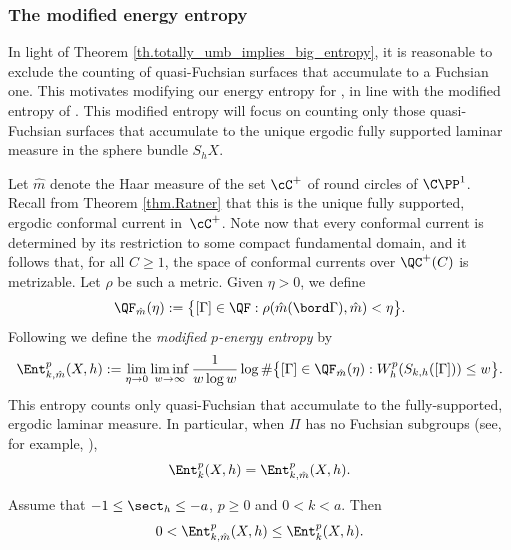 \subsubsection{The modified energy entropy}\label{sss.Modified_entropy}
In light of Theorem \ref{th.totally_umb_implies_big_entropy}, it is reasonable to exclude the counting of quasi-Fuchsian surfaces that accumulate to a Fuchsian one. This motivates modifying our energy entropy for \ksurfaces, in line with the modified entropy of \cite{MN_currents}. This modified entropy will focus on counting only those quasi-Fuchsian surfaces that accumulate to the unique ergodic fully supported laminar measure in the sphere bundle $S_hX$.

Let $\hat m$ denote the Haar measure of the set $\cC^+$ of round circles of $\C\PP^1$. Recall from Theorem \ref{thm.Ratner} that this is the unique fully supported, ergodic conformal current in~$\cC^+$. Note now that every conformal current is determined by its restriction to some compact fundamental domain, and it follows that, for all $C\geq 1$, the space of conformal currents over $\QC^+(C)$ is metrizable. Let $\rho$ be such a metric. Given $\eta>0$, we define
\begin{equation*}
\QF_{\hat m}(\eta):=\bigl\{[\Gamma]\in\QF:\rho(\hat m(\bord\Gamma),\hat m)<\eta\bigr\}.
\end{equation*}
Following \cite{MN_currents} we define the \emph{modified $p$-energy entropy} by
\begin{equation*}
\Ent^p_{k,\hat m}(X,h):=\lim_{\eta\to 0}\liminf_{w\to\infty}\frac{1}{w\log w}\log\#\bigl\{[\Gamma]\in\QF_{\hat m}(\eta):W^{p}_{h}(S_{k,h}([\Gamma]))\leq w\bigr\}.
\end{equation*}
This entropy counts only quasi-Fuchsian \ksurfaces that accumulate to the fully-supported, ergodic laminar measure. In particular, when $\Pi$ has no Fuchsian subgroups (see, for example, \cite[\S 5.3]{MR03}),
\begin{equation*}
\Ent^{p}_{k}(X,h)=\Ent^{p}_{k,\hat m}(X,h).
\end{equation*}

\begin{theorem}
Assume that $-1\leq\sect_h\leq-a$, $p\geq 0$ and $0<k<a$. Then
\begin{equation*}
0<\Ent^{p}_{k,\hat m}(X,h)\leq\Ent^{p}_{k}(X,h).
\end{equation*}
\end{theorem}


